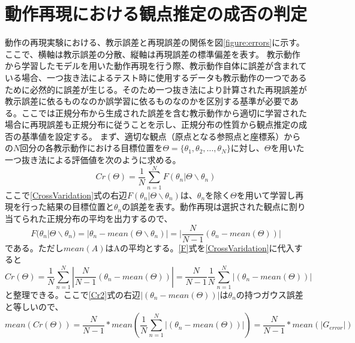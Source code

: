 ﻿\appendix
\chapter{動作再現における観点推定の成否の判定}\label{appendix1}

動作の再現実験における、教示誤差と再現誤差の関係を図\ref{figure:errors}に示す。
ここで、横軸は教示誤差の分散、縦軸は再現誤差の標準偏差を表す。
教示動作から学習したモデルを用いた動作再現を行う際、教示動作自体に誤差が含まれている場合、一つ抜き法によるテスト時に使用するデータも教示動作の一つであるために必然的に誤差が生じる。そのため一つ抜き法により計算された再現誤差が教示誤差に依るものなのか誤学習に依るものなのかを区別する基準が必要である。ここでは正規分布から生成された誤差を含む教示動作から適切に学習された場合に再現誤差も正規分布に従うことを示し、正規分布の性質から観点推定の成否の基準値を設定する。
まず、適切な観点（原点となる参照点と座標系）からの$N$回分の各教示動作における目標位置を$Θ=\{θ_{1} , θ_{2} , \ldots , θ_{N}\}$に対し、$Θ$を用いた一つ抜き法による評価値を次のように求める。
	\begin{equation}
		\label{CrossVaridation}
		Cr(Θ) = \frac{1}{N} \sum_{n=1}^{N} F(θ_{n} | Θ \backslash θ_{n})
	\end{equation}
ここで\ref{CrossVaridation}式の右辺$F(θ_{n} | Θ \backslash θ_{n})$は、$θ_{n}$を除く$Θ$を用いて学習し再現を行った結果の目標位置と$θ_{n}$の誤差を表す。動作再現は選択された観点に割り当てられた正規分布の平均を出力するので、
	\begin{equation}
		\label{F}
		F(θ_{n} | Θ \backslash θ_{n}) = |θ_{n} - mean(Θ \backslash θ_{n})| = |\frac{N}{N-1}(θ_{n} - mean(Θ))|
	\end{equation}
である。ただし$mean(A)$はAの平均とする。\ref{F}式を\ref{CrossVaridation}に代入すると
	\begin{equation}
		\label{Cr2}
		Cr(Θ) = \frac{1}{N} \sum_{n=1}^{N}  |\frac{N}{N-1}(θ_{n} - mean(Θ))|
		 = \frac{N}{N-1}\frac{1}{N}  \sum_{n=1}^{N}  |(θ_{n} - mean(Θ))| 
	\end{equation}
と整理できる。ここで\ref{Cr2}式の右辺$|(θ_{n} - mean(Θ))|$は$θ_{n}$の持つガウス誤差と等しいので、
	\begin{equation}
		\label{Cr3}
		mean(Cr(Θ)) = \frac{N}{N-1} * mean(\frac{1}{N}  \sum_{n=1}^{N}  |(θ_{n} - mean(Θ))| )
		 = \frac{N}{N-1} * mean(|G_{error}|)
	\end{equation}
